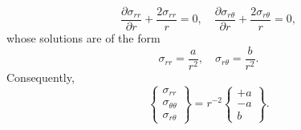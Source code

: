 \begin{equation}
  \frac{\partial \sigma_{rr}}{\partial r} + \frac{2 \sigma_{rr}}{r} = 0, \quad \frac{\partial \sigma_{r\theta}}{\partial r} + \frac{2 \sigma_{r\theta}}{r} = 0,
\end{equation}
whose solutions are of the form
\begin{equation}
  \sigma_{rr} = \frac{a}{r^2}, \quad \sigma_{r\theta} = \frac{b}{r^2}.
\end{equation}
Consequently,
\begin{equation}
  \left\{ \begin{array}{c} \sigma_{rr} \\ \sigma_{\theta \theta} \\ \sigma_{r \theta} \end{array} \right\} = r^{-2} \left\{ \begin{array}{c} +a \\ -a \\ b \end{array} \right\}.
\end{equation}

